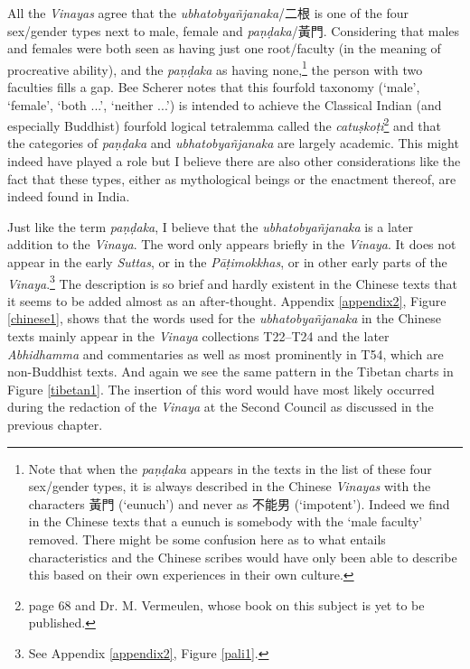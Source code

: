 All the \textit{Vinayas} agree that the \textit{ubhatob­yañ­janaka}/二根 is one of the four sex/gender types next to male, female and \textit{paṇḍaka}/黃門. Considering that males and females were both seen as having just one root/faculty (in the meaning of procreative ability), and the \textit{paṇḍaka} as having none,\footnote{Note that when the \textit{paṇḍaka} appears in the texts in the list of these four sex/gender types, it is always described in the Chinese \textit{Vinayas} with the characters 黃門 (`eunuch') and never as 不能男 (`impotent'). Indeed we find in the Chinese texts that a eunuch is somebody with the `male faculty' removed. There might be some confusion here as to what entails characteristics and the Chinese scribes would have only been able to describe this based on their own experiences in their own culture.} the person with two faculties fills a gap. Bee Scherer notes that this fourfold taxonomy (`male', `female', `both ...', `neither ...') is intended to achieve the Classical Indian (and especially Buddhist) fourfold logical tetralemma called the \textit{catuṣkoṭi}\footnote{\cite{scherer} page 68 and Dr. M. Vermeulen, whose book on this subject is yet to be published.} and that the categories of \textit{paṇḍaka} and \textit{ubhatob­yañ­janaka} are largely academic. This might indeed have played a role but I believe there are also other considerations like the fact that these types, either as mythological beings or the enactment thereof, are indeed found in India.

Just like the term \textit{paṇḍaka}, I believe that the \textit{ubhatob­yañ­janaka} is a later addition to the \textit{Vinaya}. The word only appears briefly in the \textit{Vinaya}. It does not appear in the early \textit{Suttas}, or in the \textit{Pāṭimokkhas}, or in other early parts of the \textit{Vinaya}.\footnote{See Appendix \ref{appendix2}, Figure \ref{pali1}.} The description is so brief and hardly existent in the Chinese texts that it seems to be added almost as an after-thought. Appendix \ref{appendix2}, Figure \ref{chinese1}, shows that the words used for the \textit{ubhatob­yañ­janaka} in the Chinese texts mainly appear in the \textit{Vinaya} collections T22–T24 and the later \textit{Abhidhamma} and commentaries as well as most prominently in T54, which are non-Buddhist texts. And again we see the same pattern in the Tibetan charts in Figure \ref{tibetan1}. The insertion of this word would have most likely occurred during the redaction of the \textit{Vinaya} at the Second Council as discussed in the previous chapter.

